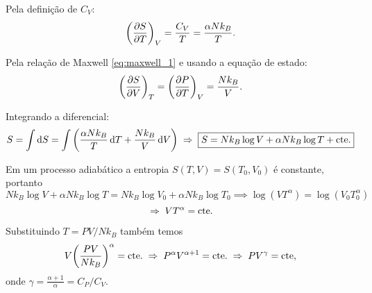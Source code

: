\documentclass[a4paper,10pt]{article}
\begin{document}
Pela definição de $C_V$:
$$
\qty(\pdv{S}{T})_{V} = \frac{C_V}{T} = \frac{\alpha N k_B}{T}.
$$

Pela relação de Maxwell \ref{eq:maxwell_1} e usando a equação de estado:
$$
\qty(\pdv{S}{V})_{T} = \qty(\pdv{P}{T})_{V} = \frac{N k_B}{V}.
$$

Integrando a diferencial:
$$
S = \int \dd{S} = \int \qty(\frac{\alpha N k_B}{T} \dd{T} + \frac{N k_B}{V} \dd{V})
\; \Rightarrow \; \boxed{ S = N k_B \log V + \alpha N k_B \log T + \text{cte}. }
$$

\n\n

Em um processo adiabático a entropia $S(T,V) = S(T_0, V_0)$ é constante, portanto
$$
N k_B \log V + \alpha N k_B \log T = N k_B \log V_0 + \alpha N k_B \log T_0 \implies
\log(V T^\alpha) = \log(V_0 T_0^\alpha)
$$
$$
\; \Rightarrow \; V T^{\alpha} = \text{cte}.
$$

Substituindo $T = PV / N k_B$ também temos
$$
V \qty(\frac{PV}{N k_B})^{\alpha} = \text{cte}. \; \Rightarrow \; P^\alpha V^{\alpha + 1} = \text{cte}. \; \Rightarrow \; P V^{\gamma} = \text{cte},
$$
onde $\gamma = \frac{\alpha + 1}{\alpha} = C_P / C_V$.
\end{document}
